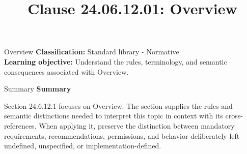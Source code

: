 \documentclass[10pt,letterpaper]{article}
\title{Clause 24.06.12.01: Overview}
\author{}
\date{}
\begin{document}
\maketitle
\begin{CornellOverviewBox}{Overview}
\textbf{Classification:} Standard library - Normative\\[2pt]
\textbf{Learning objective:} Understand the rules, terminology, and semantic consequences associated with Overview.
\end{CornellOverviewBox}\begin{CornellSummaryBox}{Summary}
{\sffamily\bfseries\color{Accent} Summary}\par\vspace{3pt}Section 24.6.12.1 focuses on Overview. The section supplies the rules and semantic distinctions needed to interpret this topic in context with its cross-references. When applying it, preserve the distinction between mandatory requirements, recommendations, permissions, and behavior deliberately left undefined, unspecified, or implementation-defined.
\end{CornellSummaryBox}
\end{document}
